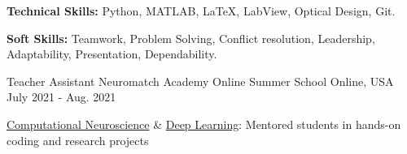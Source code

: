 \begin{cventries}
{\begin{cvitems}
\begin{itemize}
        \end{itemize}
          \item {\textbf{Technical Skills:} Python, MATLAB, \LaTeX, LabView, Optical Design, Git.}
        \item {\textbf{Soft Skills:} Teamwork, Problem Solving, Conflict resolution, Leadership, Adaptability, Presentation, Dependability.}
      \end{cvitems}
    }
  \cventry
    {Teacher Assistant}
    {Neuromatch Academy Online Summer School}
    {Online, USA}
    {July 2021 -  Aug. 2021}
    {
      \begin{cvitems} %
        \item{\href{https://github.com/NeuromatchAcademy/course-content-dl}{Computational Neuroscience} \& \href{https://github.com/NeuromatchAcademy/course-content-dl}{Deep Learning}: Mentored students in hands-on coding and research projects}
      \end{cvitems}
    }
 

\end{cventries}
